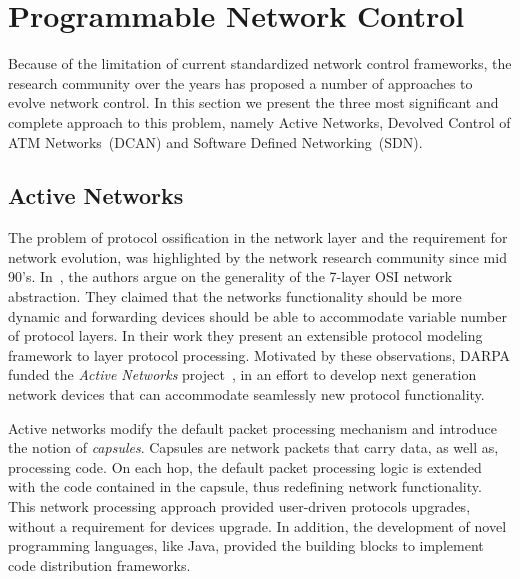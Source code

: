 \section{Programmable Network Control} \label{sec:background:prog_control}

Because of the limitation of current standardized network control frameworks,
the research community over the years has proposed a number of 
approaches to evolve network control. In this section we present the three
most significant and complete approach to this problem, namely Active Networks,
Devolved Control of ATM Networks~(DCAN) and Software Defined Networking~(SDN). 

\subsection{Active Networks}

The problem of protocol ossification in the network layer and the requirement
for network evolution, was highlighted  by the network research community since
mid 90's. In~\cite{O'Malley1992}, the authors argue on the generality of the
7-layer OSI network abstraction. They claimed that the networks functionality
should be more dynamic and forwarding devices should be able to accommodate
variable number of protocol layers. In their work they present an extensible
protocol modeling framework to layer protocol processing. Motivated by these
observations, DARPA funded the \emph{Active Networks}
project~\cite{darpa_active_net}, in an effort to develop next generation network
devices that can accommodate seamlessly new protocol functionality. 

Active networks modify the default packet processing mechanism and introduce the
notion of \emph{capsules}. Capsules are network packets that carry data, as well
as, processing code. On each hop, the default packet processing logic is
extended with the code contained in the capsule, thus redefining network
functionality. This network processing approach provided user-driven protocols
upgrades, without a requirement for devices upgrade.  In addition, the
development of novel programming languages, like Java, provided the building
blocks to implement code distribution frameworks.

